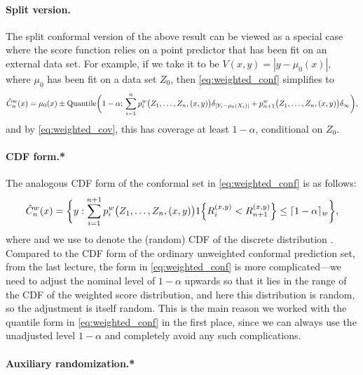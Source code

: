 \documentclass{article}
\begin{document}
\paragraph{Split version.}

The split conformal version of the above result can be viewed as a special case  
where the score function relies on a point predictor that has been fit on an
external data set. For example, if we take it to be $V(x,y) = |y-\mu_0(x)|$,
where $\mu_0$ has been fit on a data set $Z_0$, then \eqref{eq:weighted_conf} 
simplifies to       
\[
\hat{C}^w_n(x) = \mu_0(x) \pm \mathrm{Quantile}\bigg(1-\alpha; \, 
\sum_{i=1}^n p^w_i\big( Z_1,\ldots,Z_n,(x,y) \big) \delta_{|Y_i - \mu_0(X_i)|}
+ p^w_{n+1}\big( Z_1,\ldots,Z_n,(x,y) \big) \delta_\infty \bigg),
\]
and by \eqref{eq:weighted_cov}, this has coverage at least $1-\alpha$,
conditional on $Z_0$.   

\paragraph{CDF form.*}

\def\hF{\hat{F}}

The analogous CDF form of the conformal set in \eqref{eq:weighted_conf} is as
follows: 
\begin{equation}
\label{eq:weighted_cdf}
\hat{C}^w_n(x) = \bigg\{ y : \sum_{i=1}^{n+1} p^w_i\big( Z_1,\dots,Z_n,(x,y) \big) 
1\Big\{ R_i^{(x,y)} < R^{(x,y)}_{n+1} \Big\} \leq \lceil 1-\alpha \rceil_w
\bigg\},     
\end{equation}
where \smash{$\lceil 1-\alpha \rceil_w = \min\{ \tau \in \mathrm{range}(\hF^w_n)
  : \tau \geq 1-\alpha\}$} and we use \smash{$\hF^w_n$} to denote the (random)
CDF of the discrete distribution . 
Compared to the CDF form of the ordinary unweighted conformal prediction set,
from the last lecture, the form in \eqref{eq:weighted_conf} is more
complicated---we need to adjust the nominal level of $1-\alpha$ upwards so that
it lies in the range of the CDF of the weighted score distribution, and here
this distribution is random, so the adjustment is itself random. This is the
main reason we worked with the quantile form in \eqref{eq:weighted_conf} in the
first place, since we can always use the unadjusted level $1-\alpha$ and
completely avoid any such complications.

\paragraph{Auxiliary randomization.*}
\end{document}
